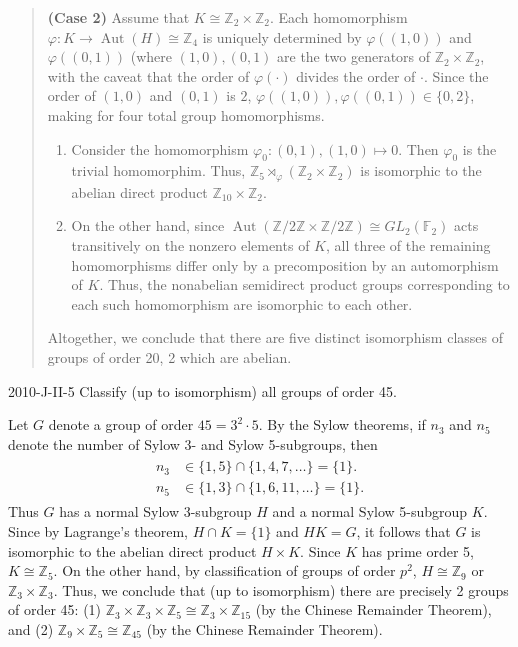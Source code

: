 \documentclass{article}
\begin{document}
\begin{quote}
		\textbf{(Case 2)} Assume that $K \cong \mathbb{Z}_{2} \times \mathbb{Z}_{2}$. Each homomorphism $\varphi: K \to \operatorname{Aut}(H) \cong \mathbb{Z}_{4}$ is uniquely determined by $\varphi((1,0))$ and $\varphi((0,1))$ (where $(1,0), (0,1)$ are the two generators of $\mathbb{Z}_{2} \times \mathbb{Z}_{2}$, with the caveat that the order of $\varphi(\cdot)$ divides the order of $\cdot$. Since the order of $(1,0)$ and $(0,1)$ is $2$, $\varphi((1,0)), \varphi((0,1)) \in \{0,2\}$, making for four total group homomorphisms.
		\begin{enumerate}[itemsep =-2pt,label = (\roman{*})]
			\item Consider the homomorphism $\varphi_{0}: (0,1), (1,0) \mapsto 0$. Then $\varphi_{0}$ is the trivial homomorphim. Thus, $\mathbb{Z}_{5} \rtimes_{\varphi} (\mathbb{Z}_{2} \times \mathbb{Z}_{2})$ is isomorphic to the abelian direct product $\mathbb{Z}_{10} \times \mathbb{Z}_{2}$. 
			\item On the other hand, since $\operatorname{Aut}(\mathbb{Z}/2\mathbb{Z} \times \mathbb{Z}/2\mathbb{Z}) \cong GL_2(\mathbb{F}_2)$ acts transitively on the nonzero elements of $K$, all three of the remaining homomorphisms differ only by a precomposition by an automorphism of $K$. Thus, the nonabelian semidirect product groups corresponding to each such homomorphism are isomorphic to each other. 
		\end{enumerate} 
		
		Altogether, we conclude that there are five distinct isomorphism classes of groups of order 20, 2 which are abelian. 
	\end{quote}
	
	\begin{prb}{2010-J-II-5}
		Classify (up to isomorphism) all groups of order 45. 
	\end{prb}
	Let $G$ denote a group of order $45 = 3^{2} \cdot 5$. By the Sylow theorems, if $n_{3}$ and $n_{5}$ denote the number of Sylow 3- and Sylow 5-subgroups, then 
	\begin{align*}
		\begin{split}
			n_{3} &\in \{1, 5\} \cap \{1, 4, 7, \ldots\} = \{1\}. \\
			n_{5} &\in \{1, 3\} \cap \{1, 6, 11, \ldots \} = \{1\}. 
		\end{split}
	\end{align*}
	Thus $G$ has a normal Sylow 3-subgroup $H$ and a normal Sylow 5-subgroup $K$. Since by Lagrange's theorem, $H \cap K = \{1\}$ and $HK = G$, it follows that $G$ is isomorphic to the abelian direct product $H \times K$. Since $K$ has prime order 5, $K \cong \mathbb{Z}_{5}$. On the other hand, by classification of groups of order $p^{2}$, $H \cong \mathbb{Z}_{9}$ or $\mathbb{Z}_{3} \times \mathbb{Z}_{3}$. Thus, we conclude that (up to isomorphism) there are precisely 2 groups of order 45: (1) $\mathbb{Z}_{3} \times \mathbb{Z}_{3} \times \mathbb{Z}_{5} \cong \mathbb{Z}_{3} \times \mathbb{Z}_{15}$ (by the Chinese Remainder Theorem), and (2) $\mathbb{Z}_{9} \times \mathbb{Z}_{5} \cong \mathbb{Z}_{45}$ (by the Chinese Remainder Theorem). 
	
\end{document}
